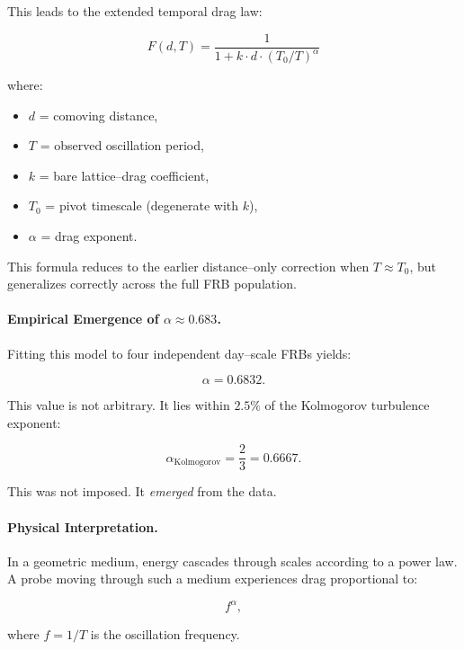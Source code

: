 \documentclass[11pt, letterpaper, openany]{book}
\begin{document}
This leads to the extended temporal drag law:

\begin{equation}
F(d,T) = \frac{1}{1 + k \cdot d \cdot (T_0/T)^\alpha}
\end{equation}

where:
\begin{itemize}
    \item $d$ = comoving distance,
    \item $T$ = observed oscillation period,
    \item $k$ = bare lattice--drag coefficient,
    \item $T_0$ = pivot timescale (degenerate with $k$),
    \item $\alpha$ = drag exponent.
\end{itemize}

This formula reduces to the earlier distance--only correction when $T \approx T_0$, but generalizes 
correctly across the full FRB population.

\paragraph{Empirical Emergence of $\alpha \approx 0.683$.}

Fitting this model to four independent day--scale FRBs yields:



\[
\alpha = 0.6832.
\]



This value is not arbitrary.  
It lies within $2.5\%$ of the Kolmogorov turbulence exponent:



\[
\alpha_{\text{Kolmogorov}} = \frac{2}{3} = 0.6667.
\]



This was not imposed.  
It \textit{emerged} from the data.

\paragraph{Physical Interpretation.}

In a geometric medium, energy cascades through scales according to a power law.  
A probe moving through such a medium experiences drag proportional to:



\[
f^\alpha,
\]



where $f = 1/T$ is the oscillation frequency.
\end{document}
